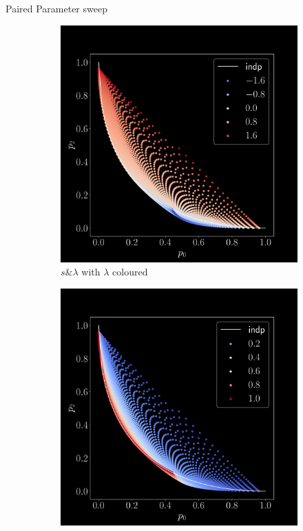 \documentclass[aspectratio=169,9pt]{beamer}
\begin{document}
\begin{frame}{Paired Parameter sweep}
  \begin{figure}[h]
    \begin{adjustwidth}{-7cm}{-7cm}
      \centering
      \begin{subfigure}[b]{0.25\textwidth}
        \centering
        \includegraphics[width=\textwidth]{sweep-sl-l}
        \caption{$s \& \lambda$ with $\lambda$ coloured}
      \end{subfigure}
      \begin{subfigure}[b]{0.25\textwidth}
        \centering
        \includegraphics[width=\textwidth]{sweep-sl-s}

\end{subfigure}
\end{adjustwidth}
\end{figure}
\end{frame}
\end{document}

